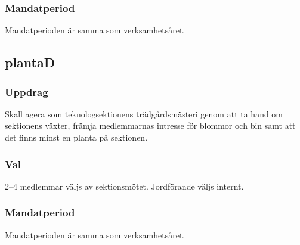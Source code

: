 \subsubsection{Mandatperiod}
Mandatperioden är samma som verksamhetsåret.

\subsection{plantaD}
\subsubsection{Uppdrag}
Skall agera som teknologsektionens trädgårdsmästeri genom att ta hand om sektionens växter, främja medlemmarnas intresse för blommor och bin samt att det finns minst en planta på sektionen.
\subsubsection{Val}
2--4 medlemmar väljs av sektionsmötet. Jordförande väljs internt.
\subsubsection{Mandatperiod}
Mandatperioden är samma som verksamhetsåret.
\newpage
